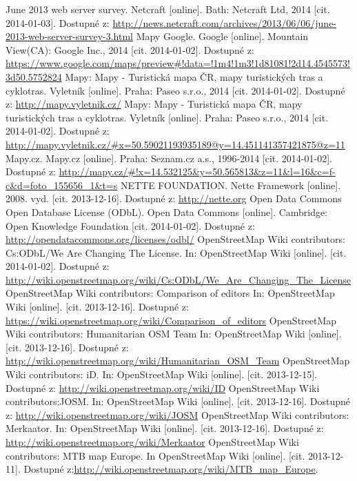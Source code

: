 \documentclass[11pt,a4paper,titlepage,oneside]{book}
\begin{document}
\begin{thebibliography}{99}
	June 2013 web server survey. Netcraft [online]. Bath: Netcraft Ltd, 2014 [cit. 2014-01-03]. Dostupné z: \url{http://news.netcraft.com/archives/2013/06/06/june-2013-web-server-survey-3.html}
	Mapy Google. Google [online]. Mountain View(CA): Google Inc., 2014 [cit. 2014-01-02]. Dostupné z: \url{https://www.google.com/maps/preview#!data=!1m4!1m3!1d81081!2d14.4545573!3d50.5752824}
	Mapy: Mapy - Turistická mapa ČR, mapy turistických tras a cyklotras. Vyletník [online]. Praha: Paseo s.r.o., 2014 [cit. 2014-01-02]. Dostupné z: \url{http://mapy.vyletnik.cz/}
	Mapy: Mapy - Turistická mapa ČR, mapy turistických tras a cyklotras. Vyletník [online]. Praha: Paseo s.r.o., 2014 [cit. 2014-01-02]. Dostupné z: \url{http://mapy.vyletnik.cz/#x=50.59021193935189@y=14.451141357421875@z=11}
	Mapy.cz. Mapy.cz [online]. Praha: Seznam.cz a.s., 1996-2014 [cit. 2014-01-02]. Dostupné z: \url{http://mapy.cz/#!x=14.532125&y=50.565813&z=11&l=16&c=f-c&d=foto_155656_1&t=s}	
	NETTE FOUNDATION. Nette Framework [online]. 2008. vyd. [cit. 2013-12-16]. Dostupné z: \url{http://nette.org} 
	Open Data Commons Open Database License (ODbL). Open Data Commons [online]. Cambridge: Open Knowledge Foundation [cit. 2014-01-02]. Dostupné z: \url{http://opendatacommons.org/licenses/odbl/}		
	OpenStreetMap Wiki contributors: Cs:ODbL/We Are Changing The License. In: OpenStreetMap Wiki [online]. [cit. 2014-01-02]. Dostupné z: \url{http://wiki.openstreetmap.org/wiki/Cs:ODbL/We_Are_Changing_The_License}
	OpenStreetMap Wiki contributors: Comparison of editors In: OpenStreetMap Wiki [online]. [cit. 2013-12-16]. Dostupné z:	\url{https://wiki.openstreetmap.org/wiki/Comparison_of_editors}
	OpenStreetMap Wiki contributors: Humanitarian OSM Team  In: OpenStreetMap Wiki [online]. [cit. 2013-12-16]. Dostupné z: \url{http://wiki.openstreetmap.org/wiki/Humanitarian_OSM_Team}
	OpenStreetMap Wiki contributors: iD. In: OpenStreetMap Wiki [online]. [cit. 2013-12-15]. Dostupné z:  \url{http://wiki.openstreetmap.org/wiki/ID}
	OpenStreetMap Wiki contributors:JOSM. In: OpenStreetMap Wiki [online]. [cit. 2013-12-16]. Dostupné z:  \url{http://wiki.openstreetmap.org/wiki/JOSM}
	OpenStreetMap Wiki contributors: Merkaator. In: OpenStreetMap Wiki [online]. [cit. 2013-12-16]. Dostupné z:  \url{http://wiki.openstreetmap.org/wiki/Merkaator}
	OpenStreetMap Wiki contributors:  MTB map Europe. In OpenStreetMap Wiki [online]. [cit. 2013-12-11]. Dostupné z:\url{http://wiki.openstreetmap.org/wiki/MTB_map_Europe}.

\end{thebibliography}
\end{document}
